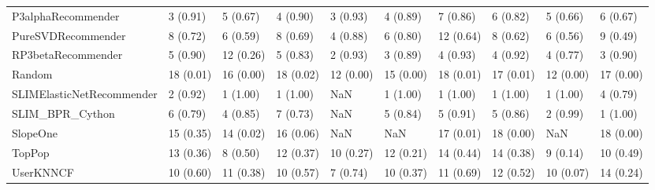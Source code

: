 \begin{tabular}{llllllllll}
                 P3alphaRecommender &                 3 (0.91) &    5 (0.67) &      4 (0.90) &     3 (0.93) &             4 (0.89) &            7 (0.86) &          6 (0.82) &           5 (0.66) &          6 (0.67) \\
                 PureSVDRecommender &                 8 (0.72) &    6 (0.59) &      8 (0.69) &     4 (0.88) &             6 (0.80) &           12 (0.64) &          8 (0.62) &           6 (0.56) &          9 (0.49) \\
                 RP3betaRecommender &                 5 (0.90) &   12 (0.26) &      5 (0.83) &     2 (0.93) &             3 (0.89) &            4 (0.93) &          4 (0.92) &           4 (0.77) &          3 (0.90) \\
                             Random &                18 (0.01) &   16 (0.00) &     18 (0.02) &    12 (0.00) &            15 (0.00) &           18 (0.01) &         17 (0.01) &          12 (0.00) &         17 (0.00) \\
          SLIMElasticNetRecommender &                 2 (0.92) &    1 (1.00) &      1 (1.00) &          NaN &             1 (1.00) &            1 (1.00) &          1 (1.00) &           1 (1.00) &          4 (0.79) \\
                    SLIM\_BPR\_Cython &                 6 (0.79) &    4 (0.85) &      7 (0.73) &          NaN &             5 (0.84) &            5 (0.91) &          5 (0.86) &           2 (0.99) &          1 (1.00) \\
                           SlopeOne &                15 (0.35) &   14 (0.02) &     16 (0.06) &          NaN &                  NaN &           17 (0.01) &         18 (0.00) &                NaN &         18 (0.00) \\
                             TopPop &                13 (0.36) &    8 (0.50) &     12 (0.37) &    10 (0.27) &            12 (0.21) &           14 (0.44) &         14 (0.38) &           9 (0.14) &         10 (0.49) \\
                          UserKNNCF &                10 (0.60) &   11 (0.38) &     10 (0.57) &     7 (0.74) &            10 (0.37) &           11 (0.69) &         12 (0.52) &          10 (0.07) &         14 (0.24) \\
\bottomrule
\end{tabular}
